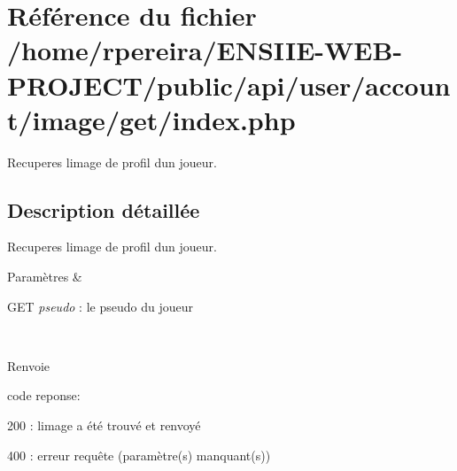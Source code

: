\hypertarget{user_2account_2image_2get_2index_8php}{}\section{Référence du fichier /home/rpereira/\+E\+N\+S\+I\+I\+E-\/\+W\+E\+B-\/\+P\+R\+O\+J\+E\+C\+T/public/api/user/account/image/get/index.php}
\label{user_2account_2image_2get_2index_8php}


Recuperes l\textquotesingle{}image de profil d\textquotesingle{}un joueur.  




\subsection{Description détaillée}
Recuperes l\textquotesingle{}image de profil d\textquotesingle{}un joueur. 


\begin{DoxyParams}{Paramètres}
{\em } & 
\begin{DoxyItemize}
\item G\+ET {\itshape pseudo} \+: le pseudo du joueur 
\end{DoxyItemize}\\
\hline
\end{DoxyParams}
\begin{DoxyReturn}{Renvoie}

\begin{DoxyItemize}
\item code reponse\+:
\begin{DoxyItemize}
\item 200 \+: l\textquotesingle{}image a été trouvé et renvoyé
\item 400 \+: erreur requête (paramètre(s) manquant(s)) 
\end{DoxyItemize}
\end{DoxyItemize}
\end{DoxyReturn}
